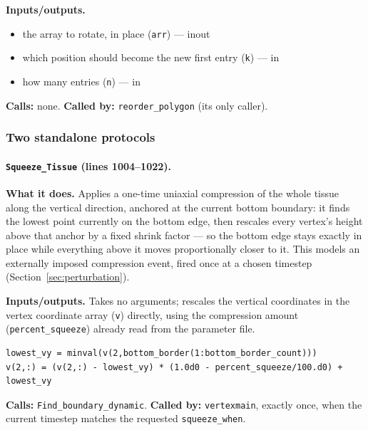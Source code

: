 \documentclass[11pt]{article}
\begin{document}
\textbf{Inputs/outputs.}
\begin{itemize}[nosep]
  \item the array to rotate, in place (\texttt{arr}) --- inout
  \item which position should become the new first entry (\texttt{k}) --- in
  \item how many entries (\texttt{n}) --- in
\end{itemize}

\textbf{Calls:} none. \textbf{Called by:} \texttt{reorder\_polygon} (its only caller).

\subsubsection*{Two standalone protocols}

\paragraph{\texttt{Squeeze\_Tissue} (lines 1004--1022).}
\textbf{What it does.} Applies a one-time uniaxial compression of the whole tissue
along the vertical direction, anchored at the current bottom boundary: it finds the
lowest point currently on the bottom edge, then rescales every vertex's height above
that anchor by a fixed shrink factor --- so the bottom edge stays exactly in place while
everything above it moves proportionally closer to it. This models an externally
imposed compression event, fired once at a chosen timestep (Section~\ref{sec:perturbation}).

\textbf{Inputs/outputs.} Takes no arguments; rescales the vertical coordinates in the
vertex coordinate array (\texttt{v}) directly, using the compression amount
(\texttt{percent\_squeeze}) already read from the parameter file.

\begin{lstlisting}[caption={The anchored compression in \texttt{Squeeze\_Tissue}.}]
lowest_vy = minval(v(2,bottom_border(1:bottom_border_count)))
v(2,:) = (v(2,:) - lowest_vy) * (1.0d0 - percent_squeeze/100.d0) + lowest_vy
\end{lstlisting}

\textbf{Calls:} \texttt{Find\_boundary\_dynamic}. \textbf{Called by:} \texttt{vertexmain},
exactly once, when the current timestep matches the requested \texttt{squeeze\_when}.
\end{document}
